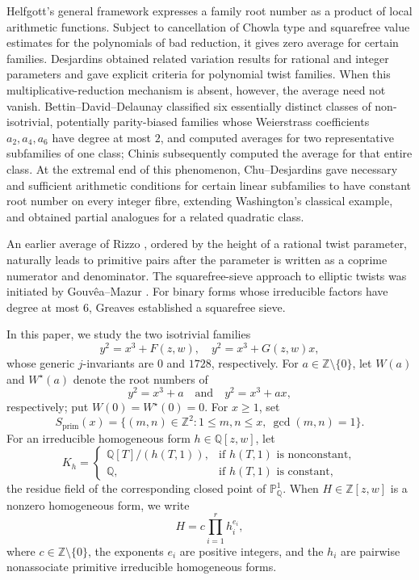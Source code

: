 \documentclass[12pt,reqno]{amsart}
\numberwithin{equation}{section}
\theoremstyle{definition}
\renewcommand{\le}{\leqslant}
\renewcommand{\ge}{\geqslant}
\newcommand{\PP}{\mathbb{P}}
\newcommand{\ZZ}{\mathbb{Z}}
\newcommand{\QQ}{\mathbb{Q}}
\newcommand{\rw}{W}
\begin{document}
Helfgott's general framework \cite{Hel} expresses a family root number as a product of local arithmetic functions.
Subject to cancellation of Chowla type and squarefree value estimates for the polynomials of bad reduction, it gives zero average for certain families.
Desjardins \cite{DesVar,DesTwist,DesInt} obtained related variation results for rational and integer parameters and gave explicit criteria for polynomial twist families.
When this multiplicative-reduction mechanism is absent, however, the average need not vanish.
Bettin--David--Delaunay \cite{BDD18} classified six essentially distinct classes of non-isotrivial, potentially parity-biased families whose Weierstrass coefficients $a_2,a_4,a_6$ have degree at most $2$, and computed averages for two representative subfamilies of one class; Chinis \cite{Chi} subsequently computed the average for that entire class.
At the extremal end of this phenomenon, Chu--Desjardins \cite{ChuDes} gave necessary and sufficient arithmetic conditions for certain linear subfamilies to have constant root number on every integer fibre, extending Washington's classical example, and obtained partial analogues for a related quadratic class.

An earlier average of Rizzo \cite{Riz99}, ordered by the height of a rational twist parameter, naturally leads to primitive pairs after the parameter is written as a coprime numerator and denominator.
The squarefree-sieve approach to elliptic twists was initiated by Gouv\^ea--Mazur \cite{GM91}.
For binary forms whose irreducible factors have degree at most $6$, Greaves \cite{Gre92} established a squarefree sieve.

In this paper, we study the two isotrivial families
\begin{equation}\label{eq:intro-families}
y^2=x^3+F(z,w),
\quad
y^2=x^3+G(z,w)x,
\end{equation}
whose generic $j$-invariants are $0$ and $1728$, respectively.
For $a\in\ZZ\setminus\{0\}$, let $\rw(a)$ and $\rw^\star(a)$ denote the root numbers of
\[
y^2=x^3+a
\quad\text{and}\quad
y^2=x^3+ax,
\]
respectively; put $\rw(0)=\rw^\star(0)=0$.
For $x\ge1$, set
\begin{equation}\label{eq:def-Sprim}
S_{\mathrm{prim}}(x)
=\{(m,n)\in\ZZ^2:1\le m,n\le x,\ \gcd(m,n)=1\}.
\end{equation}
For an irreducible homogeneous form $h\in\QQ[z,w]$, let
\begin{equation}\label{eq:def-Kh}
K_h=
\begin{cases}
\QQ[T]/(h(T,1)),&\text{if $h(T,1)$ is nonconstant},\\
\QQ,&\text{if $h(T,1)$ is constant},
\end{cases}
\end{equation}
the residue field of the corresponding closed point of $\PP^1_\QQ$.
When $H\in\ZZ[z,w]$ is a nonzero homogeneous form, we write
\begin{equation}\label{eq:intro-factorisation}
H=c\prod_{i=1}^r h_i^{e_i},
\end{equation}
where $c\in\ZZ\setminus\{0\}$, the exponents $e_i$ are positive integers, and the $h_i$ are pairwise nonassociate primitive irreducible homogeneous forms.
\end{document}
